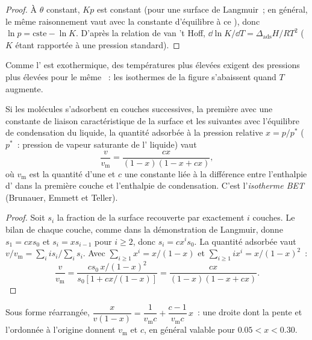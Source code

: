 \begin{proof}
À $\theta$ constant, $Kp$ est constant (pour une surface de Langmuir~;
en général, le même raisonnement vaut avec la constante d'équilibre à ce
), donc $\ln p =
\text{cste} - \ln K$. D'après la relation de van 't Hoff,
$\dd\ln K/\dd T = \Delta_{\mathrm{ads}}H/RT^2$ ($K$ étant
rapportée à une pression standard).
\end{proof}

Comme l' est exothermique, des températures plus élevées
exigent des pressions plus élevées pour le même ~:
les isothermes de la figure s'abaissent quand $T$ augmente.

\begin{theorem}\label{thm:b3:surfaces-catalysis:bet}
Si les molécules s'adsorbent en couches successives, la première avec
une constante de liaison caractéristique de la surface et les suivantes
avec l'équilibre de condensation du liquide, la quantité adsorbée à la
pression relative $x = p/p^*$ ($p^*$~: pression de vapeur saturante de
l' liquide) vaut
\[
  \frac{v}{v_{\mathrm m}} = \frac{cx}{(1 - x)(1 - x + cx)},
\]
où $v_{\mathrm m}$ est la quantité d'une  et $c$ une constante
liée à la différence entre l'enthalpie d' dans la première
couche et l'enthalpie de condensation. C'est l'\emph{isotherme
BET} (Brunauer, Emmett et Teller).
\end{theorem}

\begin{proof}
Soit $s_i$ la fraction de la surface recouverte par exactement $i$
couches. Le bilan de chaque couche, comme dans la démonstration de
Langmuir, donne $s_1 = cxs_0$ et $s_i =
xs_{i-1}$ pour $i \ge 2$, donc $s_i = cx^is_0$. La quantité adsorbée vaut $v/v_{\mathrm m} =
\sum_iis_i/\sum_is_i$. Avec $\sum_{i\ge1}x^i = x/(1 - x)$ et $\sum_{i\ge1}ix^i = x/(1 - x)^2$~:
\[
  \frac{v}{v_{\mathrm m}} = \frac{cs_0\,x/(1 - x)^2}{s_0[1 + cx/(1 - x)]} = \frac{cx}{(1 - x)(1 - x + cx)} .
\]
\end{proof}

Sous forme réarrangée, $\dfrac{x}{v(1 - x)} = \dfrac{1}{v_{\mathrm m}c} + \dfrac{c - 1}{v_{\mathrm m}c}\,x$~:
une droite dont la pente et l'ordonnée à l'origine donnent
$v_{\mathrm m}$ et $c$, en général valable pour $0.05 < x < 0.30$.

